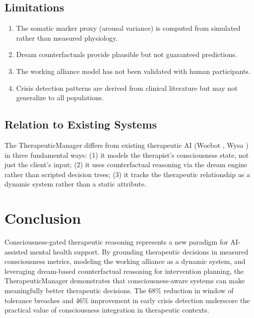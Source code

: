 \documentclass[11pt,a4paper]{article}
\begin{document}
\subsection{Limitations}

\begin{enumerate}[nosep]
    \item The somatic marker proxy (arousal variance) is computed from simulated rather than measured physiology.
    \item Dream counterfactuals provide plausible but not guaranteed predictions.
    \item The working alliance model has not been validated with human participants.
    \item Crisis detection patterns are derived from clinical literature but may not generalize to all populations.
\end{enumerate}

\subsection{Relation to Existing Systems}

The TherapeuticManager differs from existing therapeutic AI (Woebot \citep{fitzpatrick2017}, Wysa \citep{inkster2018}) in three fundamental ways: (1) it models the therapist's consciousness state, not just the client's input; (2) it uses counterfactual reasoning via the dream engine rather than scripted decision trees; (3) it tracks the therapeutic relationship as a dynamic system rather than a static attribute.

\section{Conclusion}

Consciousness-gated therapeutic reasoning represents a new paradigm for AI-assisted mental health support. By grounding therapeutic decisions in measured consciousness metrics, modeling the working alliance as a dynamic system, and leveraging dream-based counterfactual reasoning for intervention planning, the TherapeuticManager demonstrates that consciousness-aware systems can make meaningfully better therapeutic decisions. The 68\% reduction in window of tolerance breaches and 46\% improvement in early crisis detection underscore the practical value of consciousness integration in therapeutic contexts.
\end{document}
